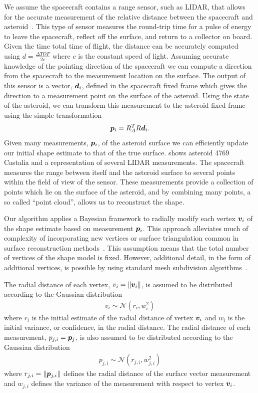 \documentclass[letterpaper, paper,11pt]{AAS}		%
\begin{document}
We assume the spacecraft contains a range sensor, such as LIDAR, that allows for the accurate measurement of the relative distance between the spacecraft and asteroid~\cite{zuber1997,zuber2000}.
This type of sensor measures the round-trip time for a pulse of energy to leave the spacecraft, reflect off the surface, and return to a collector on board.
Given the time total time of flight, the distance can be accurately computed using \( d = \frac{\Delta TOF}{2 c} \) where \( c \) is the constant speed of light.
Assuming accurate knowledge of the pointing direction of the spacecraft we can compute a direction from the spacecraft to the measurement location on the surface.
The output of this sensor is a vector, \( \bm{d}_i \), defined in the spacecraft fixed frame which gives the direction to a measurement point on the surface of the asteroid. 
Using the state of the asteroid, we can transform this measurement to the asteroid fixed frame using the simple transformation
\begin{align*}
    \bm{p}_i = R_A^T R \bm{d}_i .
\end{align*}
Given many measurements, \( \bm{p}_i \), of the asteroid surface we can efficiently update our initial shape estimate to that of the true surface.
 shows asteroid 4769 Castalia and a representation of several LIDAR measurements. 
The spacecraft measures the range between itself and the asteroid surface to several points within the field of view of the sensor. 
These measurements provide a collection of points which lie on the surface of the asteroid, and by combining many points, a so called ``point cloud'', allows us to reconstruct the shape.

Our algorithm applies a Bayesian framework to radially modify each vertex \( \bm{v}_i\) of the shape estimate based on measurement \( \bm{p}_i\). 
This approach alleviates much of complexity of incorporating new vertices or surface triangulation common in surface reconstruction methods~\cite{berg2008}.
This assumption means that the total number of vertices of the shape model is fixed.
However, additional detail, in the form of additional vertices, is possible by using standard mesh subdivision algorithms~\cite{orourke1998}.

The radial distance of each vertex, \( v_i = \left\| \bm{v}_i \right\|\), is assumed to be distributed according to the Gaussian distribution
\begin{align*}
    v_i \sim \mathcal{N}(r_i, w_i^2)
\end{align*}
where \( r_i \) is the initial estimate of the radial distance of vertex \( \bm{v}_i\) and \( w_i \) is the initial variance, or confidence, in the radial distance.
The radial distance of each measurement, \( p_{j,i} = \bm{p}_j\), is also assumed to be distributed according to the Gaussian distribution
\begin{align*}
    p_{j,i} \sim \mathcal{N}(r_{j,i}, w_{j,i}^2)
\end{align*}
where \( r_{j,i} = \left\| \bm{p}_{j,i} \right\| \) defines the radial distance of the surface vector measurement and \( w_{j, i}\) defines the variance of the measurement with respect to vertex \( \bm{v}_i\).
\end{document}
